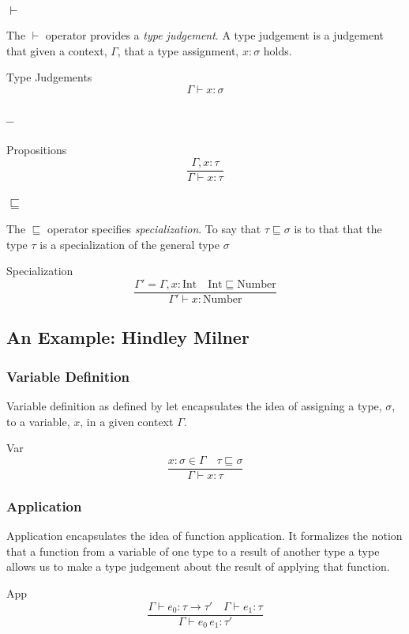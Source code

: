 \documentclass{beamer}
\begin{document}
\begin{frame}
  \frametitle{$\vdash$}
  The $\vdash$ operator provides a \emph{type judgement}.  A type
  judgement is a judgement that given a context, $\Gamma$, that a type
  assignment, $x : \sigma$ holds.
  \begin{exampleblock}{Type Judgements}
    \[
      \Gamma \vdash x : \sigma
    \]
  \end{exampleblock}
\end{frame}

\begin{frame}
  \frametitle{\---}
  \begin{exampleblock}{Propositions}
    \[
      \frac{\Gamma, x : \tau}{\Gamma \vdash x : \tau}
    \]
  \end{exampleblock}
\end{frame}

\begin{frame}
  \frametitle{$\sqsubseteq$}
  The $\sqsubseteq$ operator specifies \emph{specialization}.  To say
  that $\tau \sqsubseteq \sigma$ is to that that the type $\tau$ is a
  specialization of the general type $\sigma$
  \begin{exampleblock}{Specialization}
    \[
      \frac{\Gamma' = \Gamma, x : \text{Int} \quad \text{Int} \sqsubseteq \text{Number}}
      {\Gamma' \vdash x : \text{Number} }
    \]
  \end{exampleblock}
\end{frame}

\subsection{An Example: Hindley Milner}

\begin{frame}
  \frametitle{Variable Definition}
  Variable definition as defined by let encapsulates the idea of
  assigning a type, $\sigma$, to a variable, $x$, in a given context
  $\Gamma$.

  \begin{exampleblock}{Var}
    \[
      \frac{x:\sigma \in \Gamma \quad \tau \sqsubseteq \sigma}{\Gamma \vdash x : \tau}
    \]
  \end{exampleblock}
\end{frame}

\begin{frame}
  \frametitle{Application}
  Application encapsulates the idea of function application. It
  formalizes the notion that a function from a variable of one type to
  a result of another type a type allows us to make a type judgement
  about the result of applying that function.
  \begin{exampleblock}{App}
    \[
      \frac{\Gamma \vdash e_0 : \tau \rightarrow \tau' \quad \Gamma \vdash e_1 : \tau}
      {\Gamma \vdash e_0\, e_1 : \tau'}
    \]
  \end{exampleblock}
\end{frame}
\end{document}
